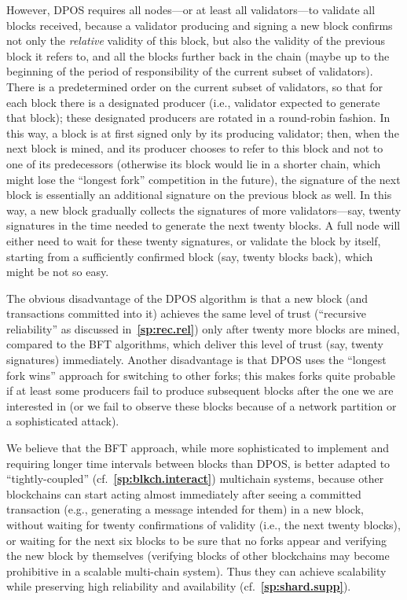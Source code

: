 \documentclass[12pt,oneside]{article}
\def\refpoint#1{{\rm\textbf{\ref{#1}}}}
\let\ptref=\refpoint
\begin{document}
However, DPOS requires all nodes---or at least all validators---to
validate all blocks received, because a validator producing and
signing a new block confirms not only the {\em relative\/} validity of
this block, but also the validity of the previous block it refers to,
and all the blocks further back in the chain (maybe up to the
beginning of the period of responsibility of the current subset of
validators). There is a predetermined order on the current subset of
validators, so that for each block there is a designated producer
(i.e., validator expected to generate that block); these designated
producers are rotated in a round-robin fashion. In this way, a block
is at first signed only by its producing validator; then, when the
next block is mined, and its producer chooses to refer to this block
and not to one of its predecessors (otherwise its block would lie in a
shorter chain, which might lose the ``longest fork'' competition in
the future), the signature of the next block is essentially an
additional signature on the previous block as well. In this way, a new
block gradually collects the signatures of more validators---say,
twenty signatures in the time needed to generate the next twenty
blocks. A full node will either need to wait for these twenty
signatures, or validate the block by itself, starting from a
sufficiently confirmed block (say, twenty blocks back), which might be
not so easy.

The obvious disadvantage of the DPOS algorithm is that a new block
(and transactions committed into it) achieves the same level of trust
(``recursive reliability'' as discussed in~\ptref{sp:rec.rel}) only
after twenty more blocks are mined, compared to the BFT algorithms,
which deliver this level of trust (say, twenty signatures)
immediately. Another disadvantage is that DPOS uses the ``longest fork
wins'' approach for switching to other forks; this makes forks quite
probable if at least some producers fail to produce subsequent blocks
after the one we are interested in (or we fail to observe these blocks
because of a network partition or a sophisticated attack).

We believe that the BFT approach, while more sophisticated to
implement and requiring longer time intervals between blocks than
DPOS, is better adapted to ``tightly-coupled''
(cf.~\ptref{sp:blkch.interact}) multichain systems, because other
blockchains can start acting almost immediately after seeing a
committed transaction (e.g., generating a message intended for them)
in a new block, without waiting for twenty confirmations of validity
(i.e., the next twenty blocks), or waiting for the next six blocks to
be sure that no forks appear and verifying the new block by themselves
(verifying blocks of other blockchains may become prohibitive in a
scalable multi-chain system). Thus they can achieve scalability while
preserving high reliability and availability
(cf.~\ptref{sp:shard.supp}).
\end{document}

